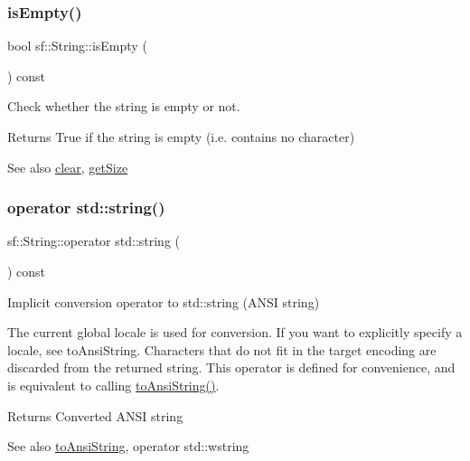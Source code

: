 \subsubsection{\texorpdfstring{isEmpty()}{isEmpty()}}
{\footnotesize\ttfamily bool sf\+::\+String\+::is\+Empty (\begin{DoxyParamCaption}{ }\end{DoxyParamCaption}) const}



Check whether the string is empty or not. 

\begin{DoxyReturn}{Returns}
True if the string is empty (i.\+e. contains no character)
\end{DoxyReturn}
\begin{DoxySeeAlso}{See also}
\mbox{\hyperlink{classsf_1_1_string_a391c1b4950cbf3d3f8040cea73af2969}{clear}}, \mbox{\hyperlink{classsf_1_1_string_ae7aff54e178f5d3e399953adff5cad20}{get\+Size}} \begin{DoxyVerb}\end{DoxyVerb}
 
\end{DoxySeeAlso}
\mbox{\label{classsf_1_1_string_a884816a0f688cfd48f9324c9741dc257}} 
\subsubsection{\texorpdfstring{operator std::string()}{operator std::string()}}
{\footnotesize\ttfamily sf\+::\+String\+::operator std\+::string (\begin{DoxyParamCaption}{ }\end{DoxyParamCaption}) const}



Implicit conversion operator to std\+::string (A\+N\+SI string) 

The current global locale is used for conversion. If you want to explicitly specify a locale, see to\+Ansi\+String. Characters that do not fit in the target encoding are discarded from the returned string. This operator is defined for convenience, and is equivalent to calling \mbox{\hyperlink{classsf_1_1_string_ada5d5bba4528aceb0a1e298553e6c30a}{to\+Ansi\+String()}}.

\begin{DoxyReturn}{Returns}
Converted A\+N\+SI string
\end{DoxyReturn}
\begin{DoxySeeAlso}{See also}
\mbox{\hyperlink{classsf_1_1_string_ada5d5bba4528aceb0a1e298553e6c30a}{to\+Ansi\+String}}, operator std\+::wstring \begin{DoxyVerb}\end{DoxyVerb}
 
\end{DoxySeeAlso}
\mbox{\label{classsf_1_1_string_a6bd1444bebaca9bbf01ba203061f5076}} 
